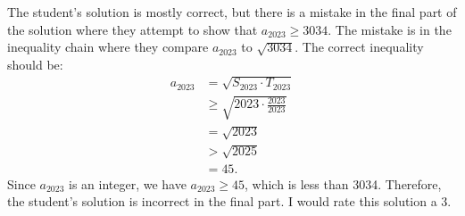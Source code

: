 The student's solution is mostly correct, but there is a mistake in the final part of the solution where they attempt to show that $a_{2023} \geq 3034$. The mistake is in the inequality chain where they compare $a_{2023}$ to $\sqrt{3034}$. The correct inequality should be:
\begin{align*}
a_{2023} &= \sqrt{S_{2023} \cdot T_{2023}} \\
&\geq \sqrt{2023 \cdot \frac{2023}{2023}} \\
&= \sqrt{2023} \\
&> \sqrt{2025} \\
&= 45.
\end{align*}
Since $a_{2023}$ is an integer, we have $a_{2023} \geq 45$, which is less than 3034. Therefore, the student's solution is incorrect in the final part. I would rate this solution a 3.

